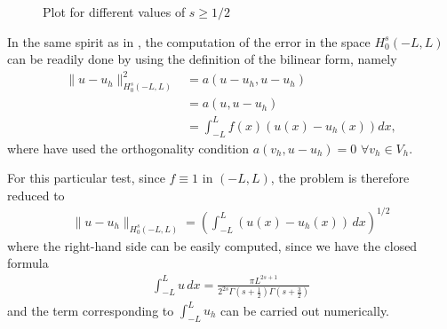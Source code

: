 \begin{figure}[!h]
		\hspace{1cm}
	\caption{Plot for different values of $s\geq 1/2$}
	\label{smas12}
\end{figure}

In the same spirit as in \cite{acosta2017short}, the computation of the error in the space $H_0^s(-L,L)$ can be readily done by using the definition of the bilinear form, namely
%
\begin{align*}
\|u-u_h\|^2_{H_0^s(-L,L)}&=a(u-u_h,u-u_h) \\
&=a(u,u-u_h) \\
&=\int_{-L}^{L}f(x)\left(u(x)-u_h(x)\right)dx,
\end{align*}
%
where have used the orthogonality condition $a(v_h,u-u_h)=0$ $\forall v_h \in V_h$.

For this particular test, since $f\equiv 1$ in $(-L,L)$, the problem is therefore reduced to
%
\begin{align*}
\|u-u_h\|_{H^s_0(-L,L)}=\left(\int_{-L}^{L}\left( u(x)-u_h(x) \right)\,dx\right)^{1/2}
\end{align*}
%
where the right-hand side can be easily computed, since we have the closed formula 
%
\begin{align}
\int_{-L}^{L}u\,dx= \frac{\pi L^{2s+1}}{2^{2s}\Gamma(s+\frac{1}{2})\Gamma(s+\frac{3}{2})}
\end{align}
% 
and the term corresponding to $\int_{-L}^{L}u_h$ can be carried out numerically. 


